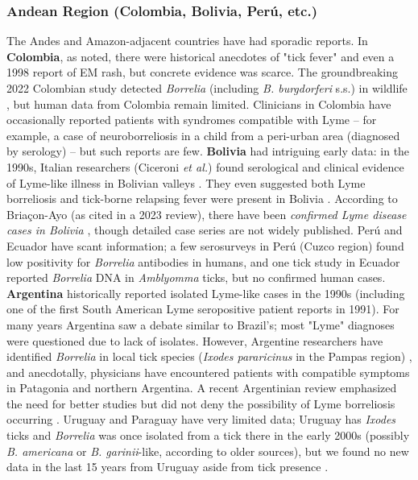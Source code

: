 \documentclass[11pt,letterpaper]{article}
\begin{document}
\subsubsection{Andean Region (Colombia, Bolivia, Perú, etc.)}
The Andes and Amazon-adjacent countries have had sporadic reports. In \textbf{Colombia}, as noted, there were historical anecdotes of "tick fever" and even a 1998 report of EM rash, but concrete evidence was scarce. The groundbreaking 2022 Colombian study detected \textit{Borrelia} (including \textit{B. burgdorferi} s.s.) in wildlife \citep{Mancilla-Agrono2022c}, but human data from Colombia remain limited. Clinicians in Colombia have occasionally reported patients with syndromes compatible with Lyme – for example, a case of neuroborreliosis in a child from a peri-urban area (diagnosed by serology) – but such reports are few. \textbf{Bolivia} had intriguing early data: in the 1990s, Italian researchers (Ciceroni \textit{et al.}) found serological and clinical evidence of Lyme-like illness in Bolivian valleys \citep{Lucca2024p}. They even suggested both Lyme borreliosis and tick-borne relapsing fever were present in Bolivia \citep{Lucca2024q}. According to Briaçon-Ayo (as cited in a 2023 review), there have been \textit{confirmed Lyme disease cases in Bolivia} \citep{Lucca2024r}, though detailed case series are not widely published. Perú and Ecuador have scant information; a few serosurveys in Perú (Cuzco region) found low positivity for \textit{Borrelia} antibodies in humans, and one tick study in Ecuador reported \textit{Borrelia} DNA in \textit{Amblyomma} ticks, but no confirmed human cases. \textbf{Argentina} historically reported isolated Lyme-like cases in the 1990s (including one of the first South American Lyme seropositive patient reports in 1991). For many years Argentina saw a debate similar to Brazil's; most "Lyme" diagnoses were questioned due to lack of isolates. However, Argentine researchers have identified \textit{Borrelia} in local tick species (\textit{Ixodes pararicinus} in the Pampas region) \citep{Lucca2024s}, and anecdotally, physicians have encountered patients with compatible symptoms in Patagonia and northern Argentina. A recent Argentinian review emphasized the need for better studies but did not deny the possibility of Lyme borreliosis occurring \citep{Lucca2024t}. Uruguay and Paraguay have very limited data; Uruguay has \textit{Ixodes} ticks and \textit{Borrelia} was once isolated from a tick there in the early 2000s (possibly \textit{B. americana} or \textit{B. garinii}-like, according to older sources), but we found no new data in the last 15 years from Uruguay aside from tick presence \citep{Lucca2024u}.
\end{document}

